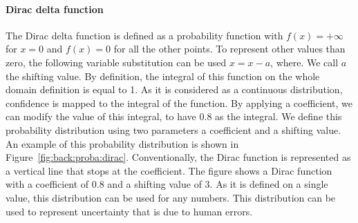 \paragraph{Dirac delta function}
The Dirac delta function is defined as a probability function with $f(x) = +\infty$ for $x=0$ and $f(x) = 0$ for all the other points.
To represent other values than zero, the following variable substitution can be used $x = x - a$,  where.
We call $a$ the shifting value.
By definition, the integral of this function on the whole domain definition is equal to 1.
As it is considered as a continuous distribution, confidence is mapped to the integral of the function.
By applying a coefficient, we can modify the value of this integral, \eg to have 0.8 as the integral.
We define this probability distribution using two parameters a coefficient and a shifting value.
An example of this probability distribution is shown in Figure~\ref{fig:back:proba:dirac}.
Conventionally, the Dirac function is represented as a vertical line that stops at the coefficient.
The figure shows a Dirac function with a coefficient of 0.8 and a shifting value of 3.
As it is defined on a single value, this distribution can be used for any numbers.
This distribution can be used to represent uncertainty that is due to human errors.